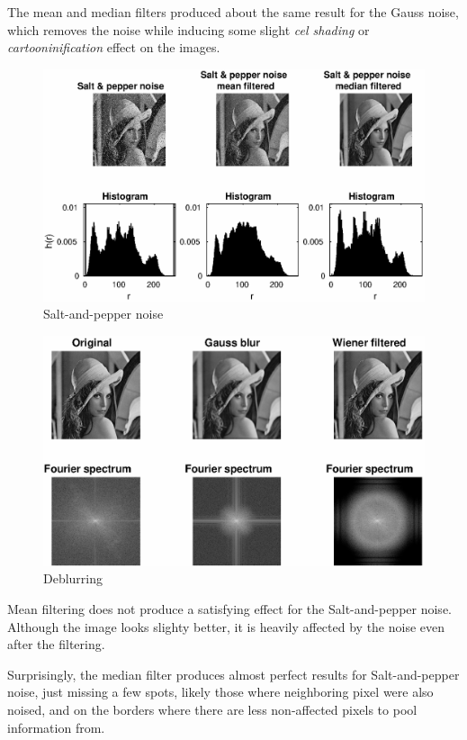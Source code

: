 \documentclass[a4paper]{article}
\begin{document}
The mean and median filters produced about the same result for the Gauss noise, which removes the noise while inducing some slight \textit{cel shading} or \textit{cartooninification} effect on the images.

\begin{figure}[!ht]
  \centerline{\includegraphics{images/2-2_saltp.eps}}
  \caption{Salt-and-pepper noise}
  \label{fig:22s}
\end{figure}
\begin{figure}[!ht]
  \centerline{\includegraphics{images/3.eps}}
  \caption{Deblurring}
  \label{fig:3}
\end{figure}

Mean filtering does not produce a satisfying effect for the Salt-and-pepper noise. Although the image looks slighty better, it is heavily affected by the noise even after the filtering.

Surprisingly, the median filter produces almost perfect results for Salt-and-pepper noise, just missing a few spots, likely those where neighboring pixel were also noised, and on the borders where there are less non-affected pixels to pool information from.
\end{document}
